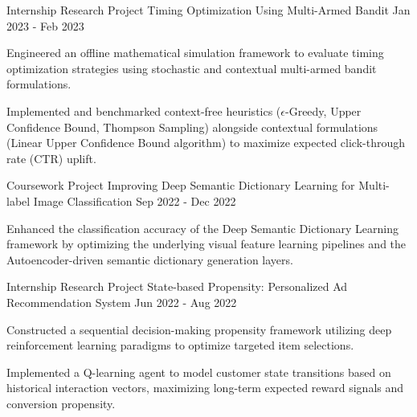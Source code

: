 \begin{cventries}
  \cventry
    {Internship Research Project} %
    {Timing Optimization Using Multi-Armed Bandit} %
    {} %
    {Jan 2023 - Feb 2023} %
    {
      \begin{cvitems} %
        \item {Engineered an offline mathematical simulation framework to evaluate timing optimization strategies using stochastic and contextual multi-armed bandit formulations.}
        \item {Implemented and benchmarked context-free heuristics ($\epsilon$-Greedy, Upper Confidence Bound, Thompson Sampling) alongside contextual formulations (Linear Upper Confidence Bound algorithm) to maximize expected click-through rate (CTR) uplift.}
      \end{cvitems}
    }

  \cventry
    {Coursework Project} %
    {Improving Deep Semantic Dictionary Learning for Multi-label Image Classification} %
    {} %
    {Sep 2022 - Dec 2022} %
    {
      \begin{cvitems} %
        \item {Enhanced the classification accuracy of the Deep Semantic Dictionary Learning framework by optimizing the underlying visual feature learning pipelines and the Autoencoder-driven semantic dictionary generation layers.}
      \end{cvitems}
    }

  \cventry
    {Internship Research Project} %
    {State-based Propensity: Personalized Ad Recommendation System} %
    {} %
    {Jun 2022 - Aug 2022} %
    {
      \begin{cvitems} %
        \item {Constructed a sequential decision-making propensity framework utilizing deep reinforcement learning paradigms to optimize targeted item selections.}
        \item {Implemented a Q-learning agent to model customer state transitions based on historical interaction vectors, maximizing long-term expected reward signals and conversion propensity.}
      \end{cvitems}
    }


\end{cventries}